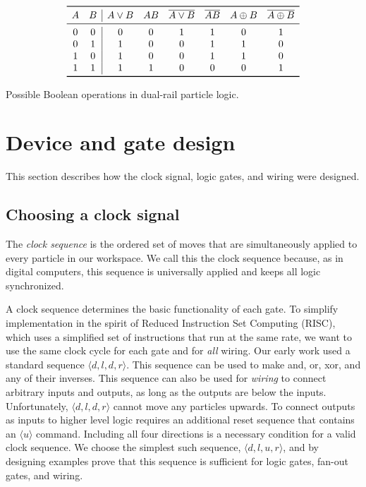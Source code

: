 \documentclass[letterpaper, 10 pt, conference]{ieeeconf}
\begin{document}
\begin{table}
\begin{displaymath}
\begin{array}{cc|cccccc}
\toprule
   A & B & A\lor{}B & AB & \overline{A\lor{}B} & \overline{AB} & A\oplus B & \overline{A\oplus B} \\
\midrule
0 & 0 & 0 & 0 & 1 & 1 & 0 & 1 \\
0 & 1 & 1 & 0 & 0 & 1 & 1 & 0 \\
1 & 0 & 1 & 0 & 0 & 1 & 1 & 0 \\
1 & 1 & 1 & 1 & 0 & 0 & 0 & 1 \\
\bottomrule
\end{array}
\end{displaymath}
  \caption{Possible Boolean operations in dual-rail particle logic.}
  \label{tab:dualRailParticleLogic}
\end{table}

\section{Device and gate design}\label{sec:Design}
This section describes how the clock signal, logic gates, and wiring were designed.

\subsection{Choosing a clock signal}

The \emph{clock sequence} is the ordered set of moves that are simultaneously applied to every particle in our workspace. We call this the clock sequence because, as in digital computers, this sequence is universally applied and keeps all logic synchronized.

A clock sequence determines the basic functionality of each gate.  To simplify implementation in the spirit of Reduced Instruction Set Computing (RISC), which uses a simplified set of instructions that run at the same rate, we want to use the same clock cycle for each gate and for \emph{all} wiring. 
Our early work used a standard sequence  $\langle d,l,d,r \rangle$.  This sequence can be used to make {\sc and, or, xor}, and any of their inverses.  This sequence can also be used for \emph{wiring} to connect arbitrary inputs and outputs, as long as the outputs are below the inputs.  Unfortunately, $\langle d,l,d,r \rangle$ cannot move any particles upwards. To connect outputs as inputs to higher level logic requires an additional reset sequence that contains an $\langle u \rangle$ command.  Including all four directions is a necessary condition for a valid clock sequence.  We choose the simplest such sequence, $\langle d,l,u,r \rangle$, and by designing examples prove that this sequence is sufficient for logic gates, {\sc fan-out} gates, and wiring.
\end{document}
